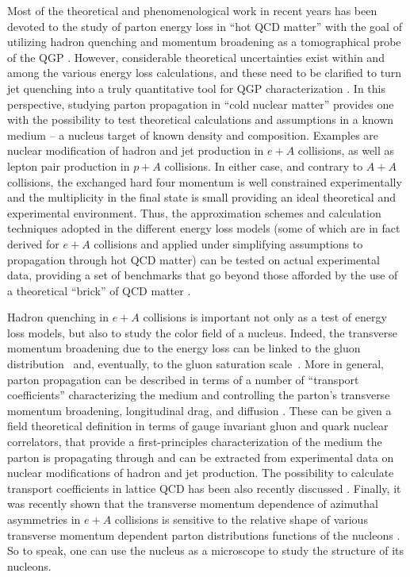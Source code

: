 Most of the theoretical and phenomenological work in recent years has been 
devoted to the study of parton energy loss in ``hot QCD matter'' with the goal 
of utilizing hadron quenching and momentum broadening as a tomographical probe 
of the QGP \cite{Majumder:2010qh}. However, considerable theoretical 
uncertainties exist within and among the various energy loss calculations, and 
these need to be clarified to turn jet quenching into a truly quantitative tool 
for QGP characterization \cite{Armesto:2011ht}. In this perspective, studying 
parton propagation in ``cold nuclear matter'' \cite{Accardi:2009qv} provides 
one with the possibility to test theoretical calculations and assumptions in a 
known medium -- a nucleus target of known density and composition. Examples are 
nuclear modification of hadron and jet production in $e+A$ collisions, as well 
as lepton pair production in $p+A$ collisions. In either case, and contrary to 
$A+A$ collisions, the exchanged hard four momentum is well constrained 
experimentally and the multiplicity in the final state is small providing an 
ideal theoretical and experimental environment. Thus, the approximation schemes 
and calculation techniques adopted in the different energy loss models (some of 
which are in fact derived for $e+A$ collisions and applied under simplifying 
assumptions to propagation through hot QCD matter) can be tested on actual 
experimental data, providing a set of benchmarks that go beyond those afforded 
by the use of a theoretical ``brick'' of QCD matter \cite{Armesto:2011ht}. 

Hadron quenching in $e+A$ collisions is important not only as a test of energy 
loss models, but also to study the color field of a nucleus. Indeed, the 
transverse momentum broadening due to the energy loss can be linked 
to the gluon distribution~\cite{Baier:1996sk} and, eventually, to the gluon 
saturation scale~\cite{Kopeliovich:2010aa}. More in general, parton propagation
can be described in terms of a number of ``transport coefficients'' 
characterizing the medium and controlling the parton's transverse momentum 
broadening, longitudinal drag, and diffusion \cite{Majumder:2008zg,%
Majumder:2007hx,Idilbi:2008vm}. These can be given a field theoretical 
definition in terms of gauge invariant gluon and quark nuclear correlators, 
that provide a first-principles characterization of the medium the parton is 
propagating through and can be extracted from experimental data on nuclear 
modifications of hadron and jet production. The possibility to calculate 
transport coefficients in lattice QCD has been also recently discussed 
\cite{Majumder:2012sh,see talk at EIC UG for recent developments}. Finally, 
it was recently shown that the transverse momentum dependence of azimuthal 
asymmetries in $e+A$ collisions is sensitive to the relative shape of various 
transverse momentum dependent parton distributions functions of the nucleons 
\cite{Gao:2010mj,Song:2010pf,Song:2013sja}. So to speak, one can use the 
nucleus as a microscope to study the structure of its nucleons.

